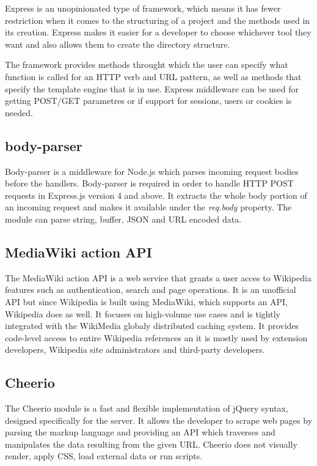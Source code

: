 \documentclass{report}
\begin{document}
Express is an unopinionated type of framework, which means it has fewer restriction when it comes to the structuring of a project and the methods used in its creation. Express makes it easier for a developer to choose whichever tool they want and also allows them to create the directory structure.\par

The framework provides methods throught which the user can specify what function is called for an HTTP verb and URL pattern, as well as methods that specify the template engine that is in use. Express middleware can be used for getting POST/GET parametres or if support for sessions, users or cookies is needed.

\subsection {body-parser}
Body-parser is a middleware for Node.js which parses incoming request bodies before the handlers. Body-parser is required in order to handle HTTP POST requests in Express.js version 4 and above. It extracts the whole body portion of an incoming request and makes it available under the \textit{req.body} property. The module can parse string, buffer, JSON and URL encoded data. 

\subsection {MediaWiki action API}
The MediaWiki action API is a web service that grants a user acces to Wikipedia features such as authentication, search and page operations. It is an unofficial API but since Wikipedia is built using MediaWiki, which supports an API, Wikipedia does as well. It focuses on high-volume use cases and is tightly integrated with the WikiMedia globaly distributed caching system. It provides code-level access to entire Wikipedia references an it is mostly used by extension developers, Wikipedia site administrators and third-party developers.

\subsection {Cheerio}
The Cheerio module is a fast and flexible implementation of jQuery syntax, designed specifically for the server. It allows the developer to scrape web pages by parsing the markup language and providing an API which traverses and manipulates the data resulting from the given URL. Cheerio does not visually render, apply CSS, load external data or run scripts.
\end{document}
